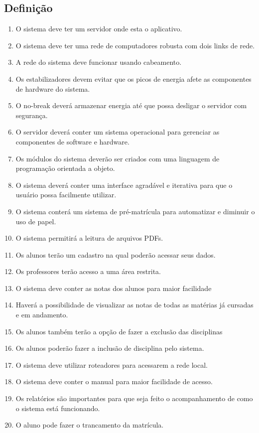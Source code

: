   \subsection{Definição}
  \begin{enumerate}
\item O sistema deve ter um servidor onde esta o aplicativo.
\item O sistema deve ter uma rede de computadores robusta com dois links de rede.
\item A rede do sistema deve  funcionar usando cabeamento.
\item Os estabilizadores devem evitar que os picos de energia afete as componentes de hardware do sistema.
\item O no-break deverá armazenar energia até que possa desligar o servidor com segurança.
\item O servidor deverá conter um sistema operacional para gerenciar as componentes de software e hardware.
\item Os módulos do sistema deverão ser criados com uma linguagem de programação orientada a objeto.
\item O sistema deverá conter uma interface agradável e iterativa para que o usuário possa facilmente utilizar.
\item O sistema conterá um sistema de pré-matrícula para automatizar e diminuir o uso de papel.
\item O sistema permitirá a leitura de arquivos PDFs.
\item Os alunos terão um cadastro na qual poderão acessar seus dados.
\item Os professores terão acesso a uma área restrita.
\item  O sistema deve conter as notas dos alunos para maior facilidade
\item Haverá a possibilidade de visualizar as notas de todas as matérias já cursadas e em andamento.
\item Os alunos também terão a opção de fazer a exclusão das disciplinas
\item Os alunos poderão fazer a inclusão de disciplina pelo sistema.
\item O sistema deve utilizar roteadores para acessarem a rede local.
\item O sistema deve conter o manual para maior facilidade de acesso.
\item Os relatórios são importantes para que seja feito o acompanhamento de como o sistema está funcionando.
\item O aluno pode fazer o trancamento da matrícula.

\end{enumerate}
